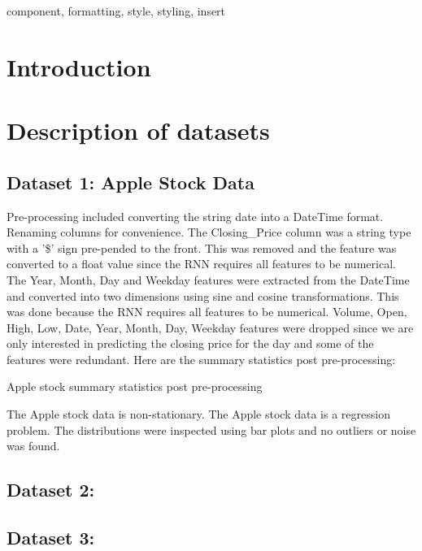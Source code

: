 \documentclass[conference]{IEEEtran}
\begin{document}
\begin{IEEEkeywords}
component, formatting, style, styling, insert
\end{IEEEkeywords}

\section{Introduction}


\section{Description of datasets}

\subsection{Dataset 1: Apple Stock Data}

Pre-processing included converting the string date into a DateTime format. Renaming columns for convenience. The Closing\_Price column was a string type with a '\$' sign pre-pended to the front. This was removed and the feature was converted to a float value since the RNN requires all features to be numerical. The Year, Month, Day and Weekday features were extracted from the DateTime and converted into two dimensions using sine and cosine transformations. This was done because the RNN requires all features to be numerical. Volume, Open, High, Low, Date, Year, Month, Day, Weekday features were dropped since we are only interested in predicting the closing price for the day and some of the features were redundant. Here are the summary statistics post pre-processing:

\begin{table}[htbp]
	\caption{Apple stock summary statistics post pre-processing}
	\label{tab:apple-summary}
\end{table}

The Apple stock data is non-stationary. The Apple stock data is a regression problem. The distributions were inspected using bar plots and no outliers or noise was found.


\subsection{Dataset 2: }

\subsection{Dataset 3: }
\end{document}
